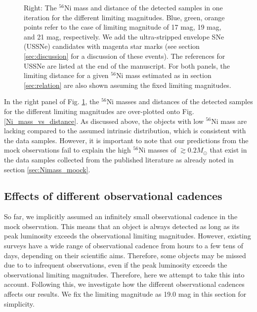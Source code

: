 \documentclass[twocolumn, linenumbers]{aastex62}
\begin{document}
\begin{figure}[htbp]
{ Right: The $^{56}$Ni mass and distance of the detected samples in one iteration for the different limiting magnitudes. Blue, green, orange points refer to the case of limiting magnitude of 17 mag, 19 mag, and 21 mag, respectively. We add the ultra-stripped envelope SNe (USSNe) candidates with magenta star marks (see section \ref{sec:discussion} for a discussion of these events). The references for USSNe are listed at the end of the manuscript. For both panels, the limiting distance for a given $^{56}$Ni mass estimated as in section \ref{sec:relation} are also shown assuming the fixed limiting magnitudes. }
  \label{Ni_vs_dist_dist_mock_different_Vlim}
\end{figure}




In the right panel of Fig. \ref{Ni_vs_dist_dist_mock_different_Vlim}, the $^{56}$Ni masses and distances of the detected samples for the different limiting magnitudes are over-plotted onto Fig.\ref{Ni_mass_vs_distance}. As discussed above, the objects with low $^{56}$Ni mass are lacking compared to the assumed intrinsic distribution, which is consistent with the data samples. However, it is important to note that our predictions from the mock observations fail to explain the high $^{56}$Ni masses of $\gtrsim 0.2 M_{\odot}$ that exist in the data samples collected from the published literature as already noted in section \ref{sec:Nimass_moock}. 

\subsection{Effects of different observational cadences}
So far, we implicitly assumed an infinitely small observational cadence in the mock observation. This means that an object is always detected as long as its peak luminosity exceeds the observational limiting magnitudes. However, existing surveys have a wide range of observational cadence from hours to a few tens of days, depending on their scientific aims. Therefore, some objects may be missed due to to infrequent observations, even if the peak luminosity exceeds the observational limiting magnitudes. 
Therefore, here we attempt to take this into account. Following this, we investigate how the different observational cadences affects our results. We fix the limiting magnitude as 19.0 mag in this section for simplicity.
\end{document}
